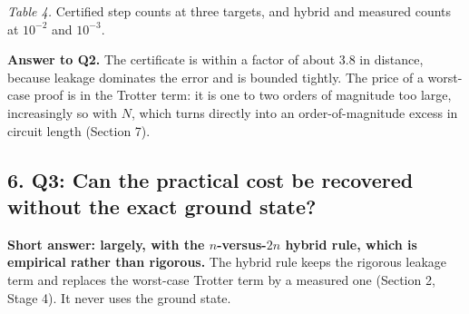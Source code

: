 \documentclass[
]{article}
\begin{document}
\emph{Table 4.} Certified step counts at three targets, and hybrid and
measured counts at \(10^{-2}\) and \(10^{-3}\).

\textbf{Answer to Q2.} The certificate is within a factor of about 3.8
in distance, because leakage dominates the error and is bounded tightly.
The price of a worst-case proof is in the Trotter term: it is one to two
orders of magnitude too large, increasingly so with \(N\), which turns
directly into an order-of-magnitude excess in circuit length (Section
7).

\hypertarget{q3-can-the-practical-cost-be-recovered-without-the-exact-ground-state}{%
\subsection{6. Q3: Can the practical cost be recovered without the exact
ground
state?}\label{q3-can-the-practical-cost-be-recovered-without-the-exact-ground-state}}

\textbf{Short answer: largely, with the \(n\)-versus-\(2n\) hybrid rule,
which is empirical rather than rigorous.} The hybrid rule keeps the
rigorous leakage term and replaces the worst-case Trotter term by a
measured one (Section 2, Stage 4). It never uses the ground state.
\end{document}
